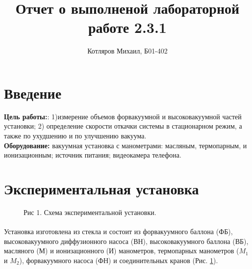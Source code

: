 \documentclass[a4paper]{article}
\title{\textbf{Отчет о выполненой лабораторной работе 2.3.1}}
\date{}
\author{Котляров Михаил, Б01-402}
\begin{document}
\maketitle
	
	\section{Введение}
	
	\textbf{Цель работы:}:  1)измерение объемов форвакуумной и высоковакуумной частей установки; 2) определение скорости откачки системы в стационарном режим, а также по ухудшению и по улучшению вакуума.\\

	\textbf{Оборудование:} вакуумная установка с манометрами: масляным, термопарным, и ионизационным; источник питания; видеокамера телефона.

\section{Экспериментальная установка}

    \begin{figure}[h]
        \caption{Рис 1. Схема экспериментальной установки.}
        \label{ris:ustanovka}
    \end{figure}

    \paragraph{}
    Установка изготовлена из стекла и состоит из форвакуумного баллона (ФБ), высоковакуумного диффузионного насоса (ВН), высоковакуумного баллона (ВБ), масляного (М) и ионизационного (И) манометров, термопарных манометров ($M_1$ и $M_2$), форвакуумного насоса (ФН) и соединительных кранов (Рис. \ref{ris:ustanovka}).
\end{document}
